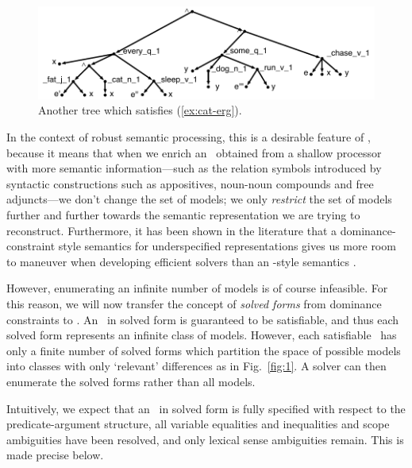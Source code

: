 \begin{figure}
  \centering
  \includegraphics[width=\columnwidth]{pic-more-stuff}
  \caption{Another tree which satisfies (\ref{ex:cat-erg}).}
  \label{fig:fat-black-cat}
\end{figure}

In the context of robust semantic processing, this is a desirable
feature of \rmrs, because it means that when we enrich an \rmrs\
obtained from a shallow processor with more semantic
information---such as the relation symbols introduced by
syntactic 
constructions such as appositives, noun-noun compounds and free
adjuncts---we don't change the set of models;
we only \emph{restrict} the set of models further and further towards
the semantic representation we are trying to reconstruct.
Furthermore, it has been shown in the literature that a
dominance-constraint style semantics for underspecified
representations gives us more room to maneuver when developing
efficient solvers than an \mrs-style semantics
\cite{Althaus_etal:JoA}.

However, enumerating an infinite number of models is of course
infeasible.  For this reason, we will now transfer the concept of
\emph{solved forms} from dominance constraints to \rmrs.  An \rmrs\ in
solved form is guaranteed to be satisfiable, and thus each solved form
represents an infinite class of models.  However, each satisfiable
\rmrs\ has only a finite number of solved forms which partition the
space of possible models into classes with only `relevant'
differences as in Fig.~\ref{fig:1}.  A solver can then enumerate the
solved forms 
rather than all models.

Intuitively, we expect that an \rmrs\ in solved form is fully
specified with respect to the predicate-argument structure, all
variable equalities and inequalities and scope ambiguities have been
resolved, and only lexical sense ambiguities remain.  This is made
precise below.

